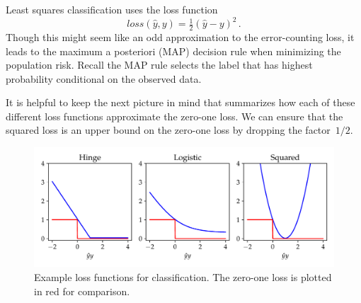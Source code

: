 \documentclass{tufte-book}
\begin{document}

Least squares classification uses the loss
function \[
\mathit{loss}(\hat y,y) =  \tfrac{1}{2}(\hat y-y)^2\,.
\] Though this might seem like an odd approximation to the
error-counting loss, it leads to the maximum a posteriori (MAP) decision
rule when minimizing the population risk. Recall the MAP rule selects
the label that has highest probability conditional on the observed
data.

It is helpful to keep the next picture in mind that summarizes how each
of these different loss functions approximate the zero-one loss. We can
ensure that the squared loss is an upper bound on the zero-one loss by
dropping the factor~\(1/2.\)

\begin{figure}
\centering
\includegraphics{assets/losses_vs_zeroone}
\caption{Example loss functions for classification. The zero-one loss is
plotted in red for comparison.}
\end{figure}
\end{document}
